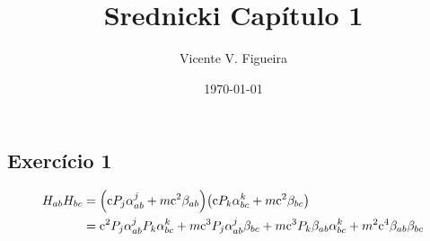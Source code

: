 \documentclass[twoside]{amsart}
\title{
Srednicki Capítulo 1
}
\author{
  Vicente V. Figueira
       }
\date{\today}
\numberwithin{equation}{section}
\begin{document}
\maketitle

\tableofcontents


\begin{refsection}
\section{Exercício 1}

\begin{align*}
    H_{ab}H_{bc}&=\qty(\textnormal{c} P_j\alpha^j_{ab}+m\textnormal{c}^2\beta_{ab})\qty(\textnormal{c} P_k\alpha^k_{bc}+m\textnormal{c}^2\beta_{bc})\\
    &=\textnormal{c}^2P_j\alpha^j_{ab}P_k\alpha^k_{bc}+m\textnormal{c}^3P_j\alpha^j_{ab}\beta_{bc}+m\textnormal{c}^3 P_k\beta_{ab}\alpha^k_{bc}+m^2\textnormal{c}^4\beta_{ab}\beta_{bc}
\end{align*}

\printbibliography[heading=subbibliography]
\end{refsection}

\end{document}
